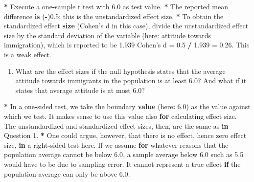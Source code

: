 \documentclass[a4paper]{book}
\newenvironment{Shaded}{\begin{snugshade}}{\end{snugshade}}
\newcommand{\KeywordTok}[1]{\textcolor[rgb]{0,0,0}{\textbf{#1}}}
\newcommand{\DataTypeTok}[1]{\textcolor[rgb]{0,0,0}{#1}}
\newcommand{\DecValTok}[1]{\textcolor[rgb]{0.00,0.00,0.00}{#1}}
\newcommand{\FloatTok}[1]{\textcolor[rgb]{0.00,0.00,0.00}{#1}}
\newcommand{\StringTok}[1]{\textcolor[rgb]{0.00,0.00,0.00}{#1}}
\newcommand{\ControlFlowTok}[1]{\textcolor[rgb]{0.00,0.00,0.00}{\textbf{#1}}}
\newcommand{\OperatorTok}[1]{\textcolor[rgb]{0.00,0.00,0.00}{\textbf{#1}}}
\newcommand{\NormalTok}[1]{#1}
\providecommand{\tightlist}{%
  \setlength{\itemsep}{0pt}\setlength{\parskip}{0pt}}
\theoremstyle{definition}
\theoremstyle{definition}
\theoremstyle{definition}
\theoremstyle{remark}
\begin{document}
\begin{Shaded}
\begin{Highlighting}[]
\OperatorTok{*}\StringTok{ }\NormalTok{Execute a one}\OperatorTok{-}\NormalTok{sample t test with }\FloatTok{6.0}\NormalTok{ as test value.}
\OperatorTok{*}\StringTok{ }\NormalTok{The reported mean difference }\KeywordTok{is}\NormalTok{ (}\OperatorTok{-}\NormalTok{)}\FloatTok{0.5}\NormalTok{; this is the unstandardized effect}
\NormalTok{size.}
\OperatorTok{*}\StringTok{ }\NormalTok{To obtain the standardized effect }\KeywordTok{size}\NormalTok{ (Cohen}\StringTok{'s d in this case), divide the}
\StringTok{unstandardized effect size by the standard deviation of the variable (here:}
\StringTok{attitude towards immigration), which is reported to be 1.939 Cohen'}\NormalTok{s }\DataTypeTok{d =} \FloatTok{0.5} \OperatorTok{/}
\FloatTok{1.939}\NormalTok{ =}\StringTok{ }\FloatTok{0.26}\NormalTok{. This is a weak effect.}
\end{Highlighting}
\end{Shaded}

\begin{enumerate}
\def\labelenumi{\arabic{enumi}.}
\setcounter{enumi}{1}
\tightlist
\item
  What are the effect sizes if the null hypothesis states that the
  average attitude towards immigrants in the population is at least 6.0?
  And what if it states that average attitude is at most 6.0?
\end{enumerate}

\begin{Shaded}
\begin{Highlighting}[]
\OperatorTok{*}\StringTok{ }\NormalTok{In a one}\OperatorTok{-}\NormalTok{sided test, we take the boundary }\KeywordTok{value}\NormalTok{ (here}\OperatorTok{:}\StringTok{ }\FloatTok{6.0}\NormalTok{) as the value}
\NormalTok{against which we test. It makes sense to use this value also }\ControlFlowTok{for}\NormalTok{ calculating}
\NormalTok{effect size. The unstandardized and standardized effect sizes, then, are the}
\NormalTok{same as }\ControlFlowTok{in}\NormalTok{ Question }\DecValTok{1}\NormalTok{.}
\OperatorTok{*}\StringTok{ }\NormalTok{One could argue, however, that there is no effect, hence zero effect size,}
\ControlFlowTok{in}\NormalTok{ a right}\OperatorTok{-}\NormalTok{sided test here. If we assume }\ControlFlowTok{for}\NormalTok{ whatever reasons that the}
\NormalTok{population average cannot be below }\FloatTok{6.0}\NormalTok{, a sample average below }\FloatTok{6.0}\NormalTok{ such as }\FloatTok{5.5}
\NormalTok{would have to be due to sampling error. It cannot represent a true effect }\ControlFlowTok{if}
\NormalTok{the population average can only be above }\FloatTok{6.0}\NormalTok{.}
\end{Highlighting}
\end{Shaded}
\end{document}
